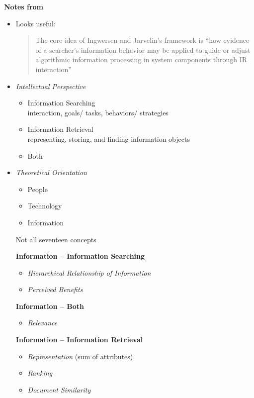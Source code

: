 \documentclass{article}
\newcommand{\note}[1]{{\footnotesize #1}}
\newcommand{\hi}[1]{{\large {\bf #1}}}
\newcommand{\hii}[1]{{\it #1}}
\newcommand{\hiii}[1]{{\it #1}}
\begin{document}
\hi{Notes from \cite{jansen09}}

\begin{itemize}

\item Looks useful:
    \begin{quote}
    The core idea of Ingwersen and Jarvelin's framework is ``how evidence of a searcher's information behavior may be applied to guide or adjust algorithmic information processing in system components through IR interaction''
    \end{quote}

\item \hii{Intellectual Perspective}
    \begin{itemize}
        \item Information Searching \\
            \note{
                interaction, goals/ tasks, behaviors/ strategies}
        \item Information Retrieval \\
            \note{
                representing, storing, and finding information objects}
        \item Both
    \end{itemize}

\item \hii{Theoretical Orientation}
    \begin{itemize}
        \item People
        \item Technology
        \item Information
    \end{itemize}

    Not all seventeen concepts

    {\bf Information -- Information Searching}
    \begin{itemize}
        \item \hiii{Hierarchical Relationship of Information} 
        \item \hiii{Perceived Benefits}
    \end{itemize}

    {\bf Information -- Both}
    \begin{itemize}
        \item \hiii{Relevance}
    \end{itemize}

    {\bf Information -- Information Retrieval}
    \begin{itemize}
        \item \hiii{Representation} (sum of attributes)
        \item \hiii{Ranking}
        \item \hiii{Document Similarity}
    \end{itemize}


\end{itemize}
\end{document}

